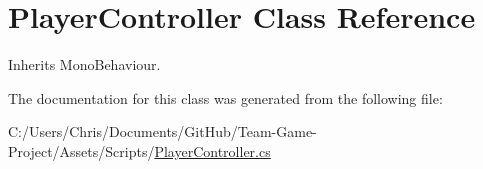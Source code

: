 \hypertarget{class_player_controller}{}\section{Player\+Controller Class Reference}
\label{class_player_controller}


Inherits Mono\+Behaviour.



The documentation for this class was generated from the following file\+:\begin{DoxyCompactItemize}
\item 
C\+:/\+Users/\+Chris/\+Documents/\+Git\+Hub/\+Team-\/\+Game-\/\+Project/\+Assets/\+Scripts/\hyperlink{_player_controller_8cs}{Player\+Controller.\+cs}\end{DoxyCompactItemize}
